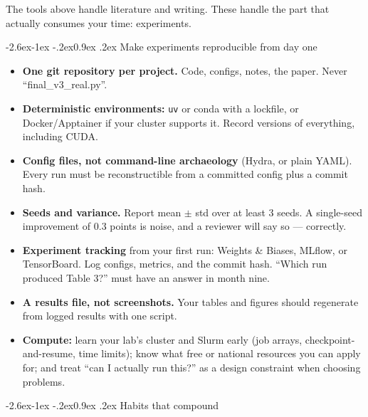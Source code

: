 \documentclass[11pt,a4paper]{article}
\makeatletter
\renewcommand\subsection{\@startsection{subsection}{2}{\z@}%
  {-2.6ex\@plus -1ex \@minus -.2ex}{0.9ex \@plus .2ex}%
  {\normalfont\large\bfseries\color{brandlight}}}
\newcommand{\code}[1]{\texttt{\small #1}}
\makeatother
\begin{document}
The tools above handle literature and writing. These handle the part that
actually consumes your time: experiments.

\subsection{Make experiments reproducible from day one}

\begin{itemize}
  \item \textbf{One git repository per project.} Code, configs, notes,
        the paper. Never ``final\_v3\_real.py''.
  \item \textbf{Deterministic environments:} \code{uv} or conda with a
        lockfile, or Docker/Apptainer if your cluster supports it. Record
        versions of everything, including CUDA.
  \item \textbf{Config files, not command-line archaeology} (Hydra,
        or plain YAML). Every run must be reconstructible from a committed
        config plus a commit hash.
  \item \textbf{Seeds and variance.} Report mean $\pm$ std over at least 3
        seeds. A single-seed improvement of 0.3 points is noise, and a
        reviewer will say so --- correctly.
  \item \textbf{Experiment tracking} from your first run: Weights \& Biases,
        MLflow, or TensorBoard. Log configs, metrics, and the commit hash.
        ``Which run produced Table 3?'' must have an answer in month nine.
  \item \textbf{A results file, not screenshots.} Your tables and figures
        should regenerate from logged results with one script.
  \item \textbf{Compute:} learn your lab's cluster and Slurm early (job arrays,
        checkpoint-and-resume, time limits); know what free or national
        resources you can apply for; and treat ``can I actually run this?'' as
        a design constraint when choosing problems.
\end{itemize}

\subsection{Habits that compound}
\end{document}
